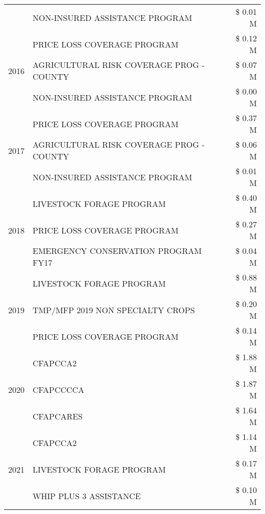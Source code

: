 \begin{tabular}{llr}
 & NON-INSURED ASSISTANCE PROGRAM & \$ 0.01 M \\
\cline{1-3}
\multirow[t]{3}{*}{2016} & PRICE LOSS COVERAGE PROGRAM                   & \$ 0.12 M \\
 & AGRICULTURAL RISK COVERAGE PROG - COUNTY      & \$ 0.07 M \\
 & NON-INSURED ASSISTANCE PROGRAM                & \$ 0.00 M \\
\cline{1-3}
\multirow[t]{3}{*}{2017} & PRICE LOSS COVERAGE PROGRAM & \$ 0.37 M \\
 & AGRICULTURAL RISK COVERAGE PROG - COUNTY & \$ 0.06 M \\
 & NON-INSURED ASSISTANCE PROGRAM & \$ 0.01 M \\
\cline{1-3}
\multirow[t]{3}{*}{2018} & LIVESTOCK FORAGE PROGRAM & \$ 0.40 M \\
 & PRICE LOSS COVERAGE PROGRAM & \$ 0.27 M \\
 & EMERGENCY CONSERVATION PROGRAM FY17 & \$ 0.04 M \\
\cline{1-3}
\multirow[t]{3}{*}{2019} & LIVESTOCK FORAGE PROGRAM & \$ 0.88 M \\
 & TMP/MFP 2019 NON SPECIALTY CROPS & \$ 0.20 M \\
 & PRICE LOSS COVERAGE PROGRAM & \$ 0.14 M \\
\cline{1-3}
\multirow[t]{3}{*}{2020} & CFAPCCA2 & \$ 1.88 M \\
 & CFAPCCCCA & \$ 1.87 M \\
 & CFAPCARES & \$ 1.64 M \\
\cline{1-3}
\multirow[t]{3}{*}{2021} & CFAPCCA2 & \$ 1.14 M \\
 & LIVESTOCK FORAGE PROGRAM & \$ 0.17 M \\
 & WHIP PLUS 3 ASSISTANCE & \$ 0.10 M \\
\cline{1-3}
\bottomrule
\end{tabular}
